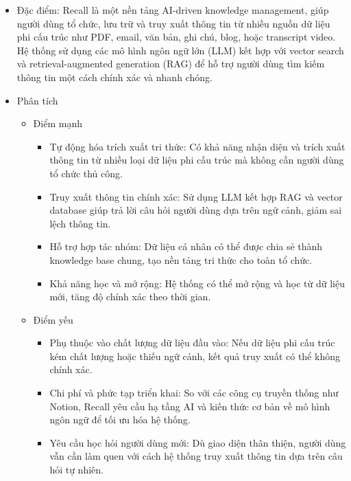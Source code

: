 \begin{itemize}
\item
  Đặc điểm: Recall là một nền tảng AI-driven knowledge management, giúp
  người dùng tổ chức, lưu trữ và truy xuất thông tin từ nhiều nguồn dữ
  liệu phi cấu trúc như PDF, email, văn bản, ghi chú, blog, hoặc
  transcript video. Hệ thống sử dụng các mô hình ngôn ngữ lớn (LLM) kết
  hợp với vector search và retrieval-augmented generation (RAG) để hỗ
  trợ người dùng tìm kiếm thông tin một cách chính xác và nhanh chóng.
\item
  Phân tích

  \begin{itemize}
  \item
    Điểm mạnh

    \begin{itemize}
    \item
      Tự động hóa trích xuất tri thức: Có khả năng nhận diện và trích
      xuất thông tin từ nhiều loại dữ liệu phi cấu trúc mà không cần
      người dùng tổ chức thủ công.
    \item
      Truy xuất thông tin chính xác: Sử dụng LLM kết hợp RAG và vector
      database giúp trả lời câu hỏi người dùng dựa trên ngữ cảnh, giảm
      sai lệch thông tin.
    \item
      Hỗ trợ hợp tác nhóm: Dữ liệu cá nhân có thể được chia sẻ thành
      knowledge base chung, tạo nền tảng tri thức cho toàn tổ chức.
    \item
      Khả năng học và mở rộng: Hệ thống có thể mở rộng và học từ dữ liệu
      mới, tăng độ chính xác theo thời gian.
    \end{itemize}
  \item
    Điểm yếu

    \begin{itemize}
    \item
      Phụ thuộc vào chất lượng dữ liệu đầu vào: Nếu dữ liệu phi cấu trúc
      kém chất lượng hoặc thiếu ngữ cảnh, kết quả truy xuất có thể không
      chính xác.
    \item
      Chi phí và phức tạp triển khai: So với các công cụ truyền thống
      như Notion, Recall yêu cầu hạ tầng AI và kiến thức cơ bản về mô
      hình ngôn ngữ để tối ưu hóa hệ thống.
    \item
      Yêu cầu học hỏi người dùng mới: Dù giao diện thân thiện, người
      dùng vẫn cần làm quen với cách hệ thống truy xuất thông tin dựa
      trên câu hỏi tự nhiên.
    \end{itemize}
  \end{itemize}
\end{itemize}

